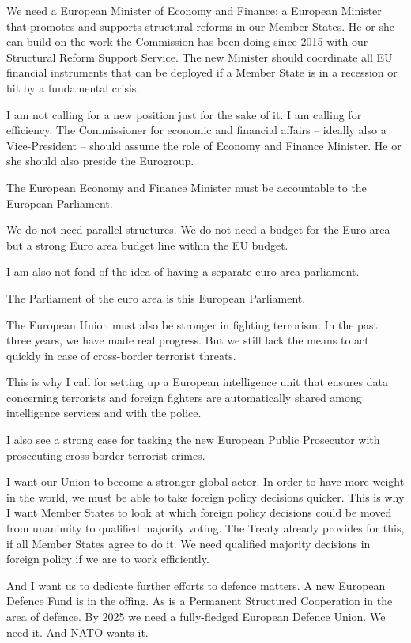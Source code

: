 \documentclass[a4paper,11pt]{article}
\begin{document}
We need a European Minister of Economy and Finance: a European Minister that promotes and supports structural reforms in our Member States. He or she can build on the work the Commission has been doing since 2015 with our Structural Reform Support Service. The new Minister should coordinate all EU financial instruments that can be deployed if a Member State is in a recession or hit by a fundamental crisis.

I am not calling for a new position just for the sake of it. I am calling for efficiency. The Commissioner for economic and financial affairs – ideally also a Vice-President – should assume the role of Economy and Finance Minister. He or she should also preside the Eurogroup.

The European Economy and Finance Minister must be accountable to the European Parliament.

We do not need parallel structures. We do not need a budget for the Euro area but a strong Euro area budget line within the EU budget.

I am also not fond of the idea of having a separate euro area parliament.

The Parliament of the euro area is this European Parliament.

 

The European Union must also be stronger in fighting terrorism. In the past three years, we have made real progress. But we still lack the means to act quickly in case of cross-border terrorist threats.

This is why I call for setting up a European intelligence unit that ensures data concerning terrorists and foreign fighters are automatically shared among intelligence services and with the police.

I also see a strong case for tasking the new European Public Prosecutor with prosecuting cross-border terrorist crimes.

 

I want our Union to become a stronger global actor. In order to have more weight in the world, we must be able to take foreign policy decisions quicker. This is why I want Member States to look at which foreign policy decisions could be moved from unanimity to qualified majority voting. The Treaty already provides for this, if all Member States agree to do it. We need qualified majority decisions in foreign policy if we are to work efficiently.

And I want us to dedicate further efforts to defence matters. A new European Defence Fund is in the offing. As is a Permanent Structured Cooperation in the area of defence. By 2025 we need a fully-fledged European Defence Union. We need it. And NATO wants it.
\end{document}
